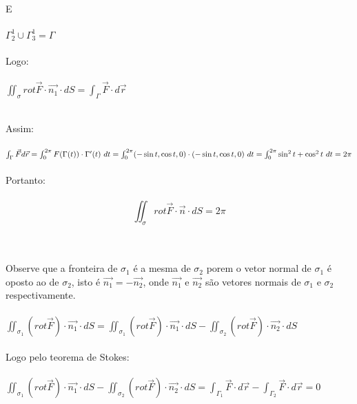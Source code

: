 \documentclass[11pt,a4paper]{article}
\begin{document}
\begin{enumerate}
{                        E \\\\
                        $\Gamma_{2}^{1} \cup \Gamma_{3}^{1} = \Gamma$\\\\
                        Logo: \\\\
                        $\iint_{\sigma} rot \vec{F} \cdot \vec{n_1} \cdot dS= \int_{\Gamma} \vec{F} \cdot d\vec{r}$\\\\
                        \item Assim: \\\\
                        $\int_{\Gamma} \vec{F}d\vec{r} = \int_{0}^{2\pi} F(\Gamma (t)) \cdot \Gamma '(t)\ dt \\\\
                        =\int_{0}^{2\pi} (-\sin t,\cos t,0)\cdot(-\sin t,\cos t,0)\ dt\\\\
                        =\int_{0}^{2\pi} \sin^2 t + \cos^2 t\ dt\\\\
                        =2\pi$\\\\
                        Portanto:\\\\
                        $$\iint_\sigma rot\vec{F}\cdot\vec{n}\cdot dS = 2\pi$$\\\\
                        \item Observe que a fronteira de $\sigma_1$ é a mesma de $\sigma_2$ porem o vetor normal de $\sigma_1$ é oposto ao de $\sigma_2$, isto é $\vec{n_1} = -\vec{n_2}$, onde $\vec{n_1}$ e $\vec{n_2}$ são vetores normais de $\sigma_1$ e $\sigma_2$ respectivamente.\\\\
                        $\iint_\sigma_1 (rot\vec{F})\cdot\vec{n_1}\cdot dS = \iint_\sigma_1 (rot\vec{F})\cdot\vec{n_1}\cdot dS - \iint_\sigma_2 (rot\vec{F})\cdot\vec{n_2}\cdot dS$\\\\
                        Logo pelo teorema de Stokes:\\\\
                        $\iint_\sigma_1 (rot\vec{F})\cdot\vec{n_1}\cdot dS - \iint_\sigma_2 (rot\vec{F})\cdot\vec{n_2}\cdot dS = \int_\Gamma_1 \vec{F}\cdot d\vec{r} - \int_\Gamma_2 \vec{F}\cdot d\vec{r} = 0$\\\\
}
\end{enumerate}
\end{document}
